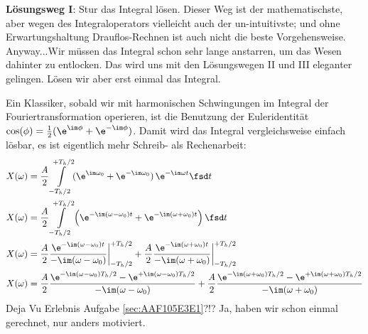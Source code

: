 %
%
%
\begin{ExCalc}
\textbf{Lösungsweg I}: Stur das Integral lösen.
Dieser Weg ist der mathematischste, aber wegen des Integraloperators vielleicht auch
der un-intuitivste; und ohne Erwartungshaltung Drauflos-Rechnen ist auch nicht die beste
Vorgehensweise. Anyway...Wir müssen das Integral schon sehr lange anstarren, um das Wesen
dahinter zu entlocken. Das wird uns mit den Lösungswegen II und III eleganter gelingen.
Lösen wir aber erst einmal das Integral.

Ein Klassiker, sobald wir mit harmonischen Schwingungen im Integral
der Fouriertransformation operieren, ist die Benutzung der Euleridentität
$\cos(\phi) = \frac{1}{2}(\e^{\im \phi} + \e^{-\im \phi})$.
Damit wird das Integral vergleichsweise einfach lösbar, es ist eigentlich mehr
Schreib- als Rechenarbeit:
\begin{align}
&X(\omega) = \frac{A}{2} \int\limits_{-T_h/2}^{+T_h/2} (\e^{\im \omega_0} + \e^{-\im \omega_0}) \, \e^{-\im \omega t} \fsd t
\\
&X(\omega) = \frac{A}{2}\int\limits_{-T_h/2}^{+T_h/2} \left(\e^{-\im (\omega-\omega_0) t} + \e^{-\im (\omega+\omega_0) t} \right) \fsd t
\\
&X(\omega) =
\frac{A}{2} \frac{\e^{-\im (\omega-\omega_0) t}}{-\im (\omega-\omega_0)}\bigg|_{-T_h/2}^{+T_h/2}
+\frac{A}{2} \frac{\e^{-\im (\omega+\omega_0) t}}{-\im (\omega+\omega_0)}\bigg|_{-T_h/2}^{+T_h/2}
\\
&X(\omega) =
\frac{A}{2} \frac{\e^{-\im (\omega-\omega_0) T_h/2} - \e^{+\im (\omega-\omega_0) T_h/2}}{-\im (\omega-\omega_0)}
+\frac{A}{2} \frac{\e^{-\im (\omega+\omega_0) T_h/2} - \e^{+\im (\omega+\omega_0) T_h/2}}{-\im (\omega+\omega_0)}
\end{align}
%
Deja Vu Erlebnis Aufgabe \ref{sec:AAF105E3E1}?!? Ja, haben wir schon einmal gerechnet, nur anders motiviert.


\end{ExCalc}
